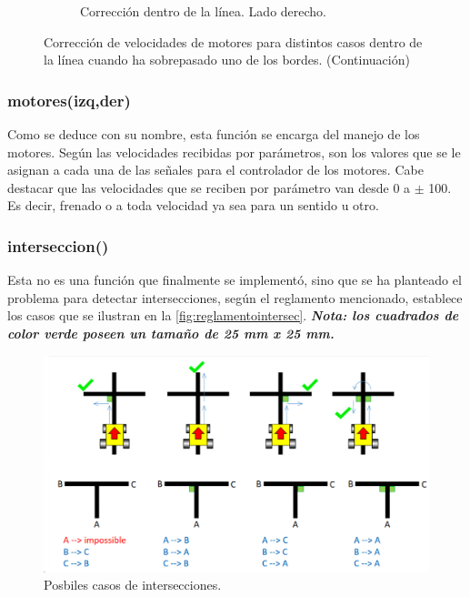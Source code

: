 \documentclass[11pt,a4paper]{article}
\begin{document}
\begin{itemize}
\begin{figure}[h!]
\begin{subfigure}{0.45\textwidth}
				\caption{Corrección dentro de la línea. Lado derecho.}
				\label{subfig:seguidor_brusco_der2}
			\end{subfigure}
			\caption{Corrección de velocidades de motores para distintos casos dentro de la línea cuando ha sobrepasado uno de los bordes. (Continuación)}
			\label{fig:seguidor_brusco}
		\end{figure}
		
	\end{itemize}
	
	\subsubsection{motores(izq,der)}
	Como se deduce con su nombre, esta función se encarga del manejo de los motores. Según las velocidades recibidas por parámetros, son los valores que se le asignan a cada una de las señales para el controlador de los motores. Cabe destacar que las velocidades que se reciben por parámetro van desde 0 a $\pm$ 100. Es decir, frenado o a toda velocidad ya sea para un sentido u otro. 
	
	\pagebreak
	\subsubsection{interseccion()}
	Esta no es una función que finalmente se implementó, sino que se ha planteado el problema para detectar intersecciones, según el reglamento mencionado, establece los casos que se ilustran en la \autoref*{fig:reglamentointersec}. \textbf{\textit{Nota: los cuadrados de color verde poseen un tamaño de 25 mm x 25 mm.}}
	
	\begin{figure}[h!]
		\centering
		\includegraphics[width=\linewidth]{imagenes/reglamento_intersec}
		\caption{Posbiles casos de intersecciones.}
		\label{fig:reglamentointersec}
	\end{figure}
	
\end{document}
